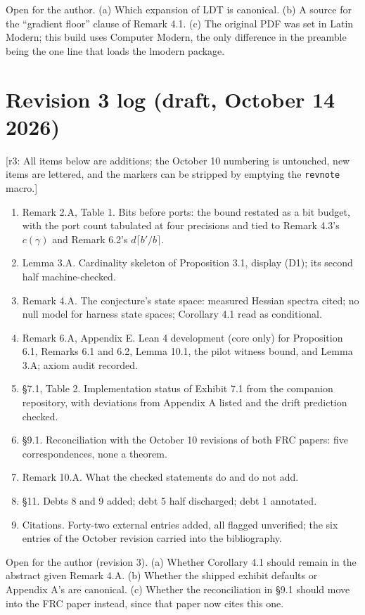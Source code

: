 \documentclass[11pt]{article}
\theoremstyle{definition}
\theoremstyle{remark}
\newcommand{\revnote}[1]{\textcolor{red!60!black}{[r3: #1]}}
\begin{document}
Open for the author. (a) Which expansion of LDT is canonical. (b) A source for the ``gradient floor'' clause of Remark 4.1. (c) The original PDF was set in Latin Modern; this build uses Computer Modern, the only difference in the preamble being the one line that loads the lmodern package.

\section*{Revision 3 log (draft, October 14 2026)}
\revnote{All items below are additions; the October 10 numbering is untouched, new items are lettered, and the markers can be stripped by emptying the \texttt{revnote} macro.}
\begin{enumerate}
\item Remark 2.A, Table 1. Bits before ports: the bound restated as a bit budget, with the port count tabulated at four precisions and tied to Remark 4.3's $c(\gamma)$ and Remark 6.2's $d\lceil b'/b\rceil$.
\item Lemma 3.A. Cardinality skeleton of Proposition 3.1, display (D1); its second half machine-checked.
\item Remark 4.A. The conjecture's state space: measured Hessian spectra cited; no null model for harness state spaces; Corollary 4.1 read as conditional.
\item Remark 6.A, Appendix E. Lean 4 development (core only) for Proposition 6.1, Remarks 6.1 and 6.2, Lemma 10.1, the pilot witness bound, and Lemma 3.A; axiom audit recorded.
\item \S7.1, Table 2. Implementation status of Exhibit 7.1 from the companion repository, with deviations from Appendix A listed and the drift prediction checked.
\item \S9.1. Reconciliation with the October 10 revisions of both FRC papers: five correspondences, none a theorem.
\item Remark 10.A. What the checked statements do and do not add.
\item \S11. Debts 8 and 9 added; debt 5 half discharged; debt 1 annotated.
\item Citations. Forty-two external entries added, all flagged unverified; the six entries of the October revision carried into the bibliography.
\end{enumerate}
Open for the author (revision 3). (a) Whether Corollary 4.1 should remain in the abstract given Remark 4.A. (b) Whether the shipped exhibit defaults or Appendix A's are canonical. (c) Whether the reconciliation in \S9.1 should move into the FRC paper instead, since that paper now cites this one.



\end{document}
